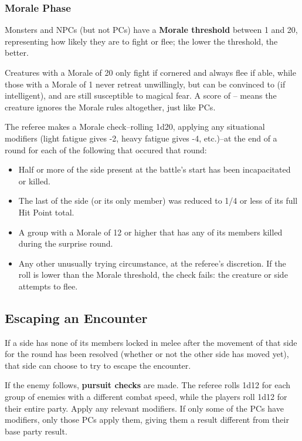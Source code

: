 \documentclass{article}
\begin{document}
\begin{multicols}{2}
\subsubsection{Morale Phase}\label{morale-phase}

Monsters and NPCs (but not PCs) have a \textbf{Morale threshold} between
1 and 20, representing how likely they are to fight or flee; the lower
the threshold, the better.

Creatures with a Morale of 20 only fight if cornered and always flee if
able, while those with a Morale of 1 never retreat unwillingly, but can
be convinced to (if intelligent), and are still susceptible to magical
fear. A score of -- means the creature ignores the Morale rules
altogether, just like PCs.

The referee makes a Morale check--rolling 1d20, applying any situational
modifiers (light fatigue gives -2, heavy fatigue gives -4, etc.)--at the
end of a round for each of the following that occured that round:

\begin{itemize}
\tightlist
\item
  Half or more of the side present at the battle's start has been
  incapacitated or killed.
\item
  The last of the side (or its only member) was reduced to 1/4 or less
  of its full Hit Point total.
\item
  A group with a Morale of 12 or higher that has any of its members
  killed during the surprise round.
\item
  Any other unusually trying circumstance, at the referee's discretion.
  If the roll is lower than the Morale threshold, the check fails: the
  creature or side attempts to flee.
\end{itemize}

\subsection{Escaping an Encounter}\label{escaping-an-encounter}

If a side has none of its members locked in melee after the movement of
that side for the round has been resolved (whether or not the other side
has moved yet), that side can choose to try to escape the encounter.

If the enemy follows, \textbf{pursuit checks} are made. The referee
rolls 1d12 for each group of enemies with a different combat speed,
while the players roll 1d12 for their entire party. Apply any relevant
modifiers. If only some of the PCs have modifiers, only those PCs apply
them, giving them a result different from their base party result.


\end{multicols}
\end{document}
